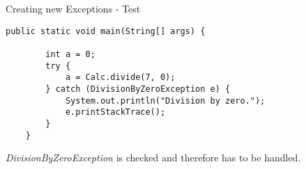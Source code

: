 \begin{frame}[fragile]{Creating new Exceptions - Test}
	\begin{lstlisting}[basicstyle=\ttfamily\scriptsize]
	public static void main(String[] args) {
	
		int a = 0;
		try {
			a = Calc.divide(7, 0);
		} catch (DivisionByZeroException e) {
			System.out.println("Division by zero.");
			e.printStackTrace();
		}
	}
	\end{lstlisting}	
	\emph{DivisionByZeroException} is checked and therefore has to be handled.
\end{frame}

